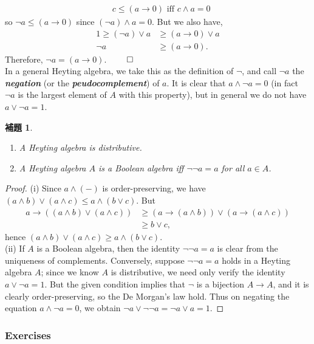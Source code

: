 \documentclass[a4j,12pt]{jarticle}
\numberwithin{equation}{section}
\newcommand{\itbf}[1]{\textit{\textbf{#1}}}
\newtheorem{lemma}[thm]{補題}
\begin{document}
\begin{align*}
  &c \le (a \rightarrow 0) \text{ iff } c \wedge a = 0
\end{align*}
so $\neg a \le (a \rightarrow 0)$ since $(\neg a) \wedge a = 0$. But we also have,
\begin{align*}
  1 \ge (\neg a) \vee a &\ge (a \rightarrow 0) \vee a \\
  \neg a &\ge (a \rightarrow 0).
\end{align*}
Therefore, $\neg a = (a \rightarrow 0)$. $\qed$\\
In a general Heyting algebra, we take this as the definition of $\neg$, and call $\neg a$ the \itbf{negation} (or the \itbf{peudocomplement}) of $a$.
It is clear that $a \wedge \neg a = 0$ (in fact $\neg a$ is the largest element of $A$ with this property), but in general we do not have $a \vee \neg a = 1$.
\begin{lemma}
  \begin{enumerate}
  \item A Heyting algebra is distributive.
  \item A Heyting algebra $A$ is a Boolean algebra iff $\neg \neg a = a$ for all $a \in A$.
  \end{enumerate}
\end{lemma}
\begin{proof}
  (i) Since $a \wedge (-)$ is order-preserving, we have $(a \wedge b) \vee  (a \wedge c) \le a \wedge (b \vee c)$. But
  \begin{align*}
    a \rightarrow ((a \wedge b) \vee (a \wedge c)) & \ge  (a \rightarrow (a \wedge b)) \vee (a \rightarrow (a \wedge c)) \\
                                                   & \ge  b \vee c,
  \end{align*}
  hence $(a \wedge b) \vee  (a \wedge c) \ge a \wedge (b \vee c)$. \\
  (ii) If $A$ is a Boolean algebra, then the identity $\neg \neg a = a$ is clear from the uniqueness of complements.
  Conversely, suppose $\neg \neg a = a$ holds in a Heyting algebra $A$; since we know $A$ is distributive, we need only verify the identity $a \vee \neg a = 1$.
  But the given condition implies that $\neg$ is a bijection $A \rightarrow A$, and it is clearly order-preserving, so the De Morgan's law hold.
  Thus on negating the equation $a \wedge \neg a =0$, we obtain $\neg a \vee \neg \neg a = \neg a \vee a = 1$.
\end{proof}
\subsubsection{Exercises}
\end{document}
